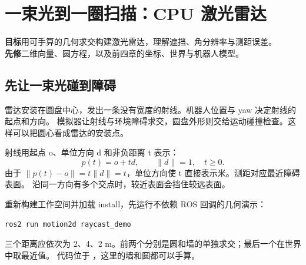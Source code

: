 \chapter{一束光到一圈扫描：CPU 激光雷达}\label{ch:lidar}
\begin{notebox}
\textbf{目标}\quad 用可手算的几何求交构建激光雷达，理解遮挡、角分辨率与测距误差。\\
\textbf{先修}\quad 二维向量、圆方程，以及前四章的坐标、世界与机器人模型。
\end{notebox}

\section{先让一束光碰到障碍}
雷达安装在圆盘中心，发出一条没有宽度的射线。机器人位置与 yaw 决定射线的起点和方向。
模拟器让射线与环境障碍求交，圆盘外形则交给运动碰撞检查。这样可以把圆心看成雷达的安装点。

射线用起点 o、单位方向 d 和非负距离 t 表示：
\begin{equation}
p(t)=o+td,\qquad \|d\|=1,\quad t\geq0.
\end{equation}
由于 $\|p(t)-o\|=t\|d\|=t$，单位方向使 t 直接表示米。测距对应最近障碍表面。
沿同一方向有多个交点时，较近表面会挡住较远表面。

\begin{center}
\end{center}

重新构建工作空间并加载 install，先运行不依赖 ROS 回调的几何演示：
\begin{lstlisting}[language=bash,numbers=none]
ros2 run motion2d raycast_demo
\end{lstlisting}
三个距离应依次为 2、4、2 m。前两个分别是圆和墙的单独求交；最后一个在世界中取最近值。
代码位于 ，这里的墙和圆都可以手算。


